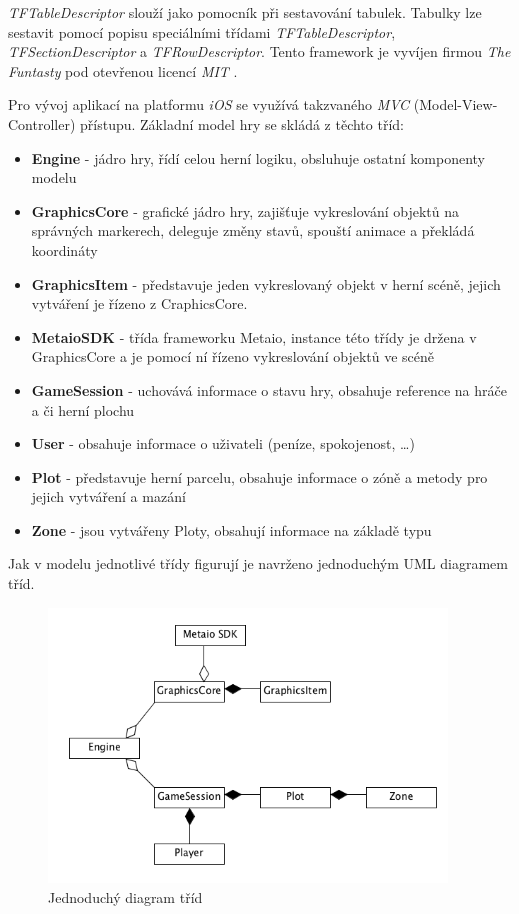 \documentclass[twoside,12pt]{article}
\begin{document}
\textit{TFTableDescriptor} slouží jako pomocník při sestavování tabulek. Tabulky lze sestavit pomocí popisu  speciálními třídami \textit{TFTableDescriptor}, \textit{TFSectionDescriptor} a \textit{TFRowDescriptor}. Tento framework je vyvíjen firmou \textit{The Funtasty} pod otevřenou licencí \textit{MIT} \cite{tftabledescriptor}.

Pro vývoj aplikací na platformu \textit{iOS} se využívá takzvaného \textit{MVC} (Model-View-Controller) přístupu. Základní model hry se skládá z těchto tříd:

\begin{itemize}
	\item \textbf{Engine} - jádro hry, řídí celou herní logiku, obsluhuje ostatní komponenty modelu
	\item \textbf{GraphicsCore} - grafické jádro hry, zajišťuje vykreslování objektů na správných markerech, deleguje změny stavů, spouští animace a překládá koordináty
	\item \textbf{GraphicsItem} - představuje jeden vykreslovaný objekt v herní scéně, jejich vytváření je řízeno z CraphicsCore.
	\item \textbf{MetaioSDK} - třída frameworku Metaio, instance této třídy je držena v GraphicsCore a je pomocí ní řízeno vykreslování objektů ve scéně
	\item \textbf{GameSession} - uchovává informace o stavu hry, obsahuje reference na hráče a či herní plochu
	\item \textbf{User} - obsahuje informace o uživateli (peníze, spokojenost, \dots)
	\item \textbf{Plot} - představuje herní parcelu, obsahuje informace o zóně a metody pro jejich vytváření a mazání
	\item \textbf{Zone} - jsou vytvářeny Ploty, obsahují informace na základě typu
\end{itemize}

Jak v modelu jednotlivé třídy figurují je navrženo jednoduchým UML diagramem tříd.

\begin{figure}[H]
\centering
    \includegraphics[width=400px, center]{images/model.png}
\captionsetup{justification=centering}
    \caption{Jednoduchý diagram tříd}
    \label{class_diagram}
\end{figure}
\end{document}
